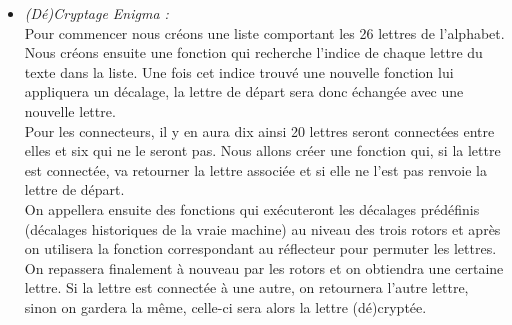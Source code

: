 \documentclass[a4paper,12pt,abstracton,titlepage]{scrartcl}
\begin{document}
{\begin{itemize}
\item \textit{(Dé)Cryptage Enigma :}\\
Pour commencer nous créons une liste comportant les 26 lettres de l'alphabet. Nous créons ensuite une fonction qui recherche l'indice de chaque lettre du texte dans la liste. Une fois cet indice trouvé une nouvelle fonction lui appliquera un décalage, la lettre de départ sera donc échangée avec une nouvelle lettre.\\ 
Pour les connecteurs, il y en aura dix ainsi 20 lettres seront connectées entre elles et six qui ne le seront pas. Nous allons créer une fonction qui, si la lettre est connectée, va retourner la lettre associée et si elle ne l’est pas renvoie la lettre de départ.\\
On appellera ensuite des fonctions qui exécuteront les décalages prédéfinis (décalages historiques de la vraie machine) au niveau des trois rotors et après on utilisera la fonction correspondant au réflecteur pour permuter les lettres. On repassera finalement à nouveau par les rotors et on obtiendra une certaine lettre. Si la lettre est connectée à une autre, on retournera l’autre lettre, sinon on gardera la même, celle-ci sera alors la lettre (dé)cryptée.\\
\end{itemize}

\newpage
}
\end{document}

